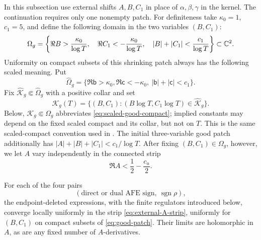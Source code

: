 In this subsection use external shifts $A,B,C_1$ in place of
$\alpha,\beta,\gamma$ in the kernel.  The continuation requires only one
nonempty patch.  For definiteness take $\kappa_0=1$, $c_1=5$, and define the
following domain in the two variables $(B,C_1)$:
\begin{equation}\label{eq:good-patch}
 \Omega_g=\left\{
 \Re B>\frac{\kappa_0}{\log T},\quad
 \Re C_1<-\frac{\kappa_0}{\log T},\quad
 |B|+|C_1|<\frac{c_1}{\log T}\right\}\subset\mathbb C^2.
\end{equation}
Uniformity on compact subsets of this shrinking patch always has the following
scaled meaning.  Put
\[
 \widehat\Omega_g=\{\Re\mathsf b>\kappa_0,
 \Re\mathsf c<-\kappa_0,\ |\mathsf b|+|\mathsf c|<c_1\}.
\]
Fix $\widehat{\mathscr K}_g\Subset\widehat\Omega_g$ with a positive collar and
set
\begin{equation}\label{eq:scaled-good-compact}
 \mathscr K_g(T)=\{(B,C_1):(B\log T,C_1\log T)
                         \in\widehat{\mathscr K}_g\}.
\end{equation}
Below, $\mathscr K_g\Subset\Omega_g$ abbreviates
\eqref{eq:scaled-good-compact}; implied constants may depend on the fixed
scaled compact and its collar, but not on $T$.  This is the same scaled-compact
convention used in .
The initial three-variable good patch additionally has
$|A|+|B|+|C_1|<c_1/\log T$.  After fixing $(B,C_1)\in\Omega_g$, however, we
let $A$ vary independently in the connected strip
\begin{equation}\label{eq:external-A-strip}
                       \Re A<\frac12-\frac{c_u}{2}.
\end{equation}

\begin{lemma}\label{lem:source-normality}
For each of the four pairs
\[(\text{direct or dual AFE sign},\ \operatorname{sgn}\rho),\]
the endpoint-deleted expressions, with the finite regulators introduced
below, converge locally uniformly in the strip
\eqref{eq:external-A-strip}, uniformly for $(B,C_1)$ on compact subsets of
\eqref{eq:good-patch}.  Their limits are holomorphic in $A$, as are any fixed
number of $A$-derivatives.
\end{lemma}

